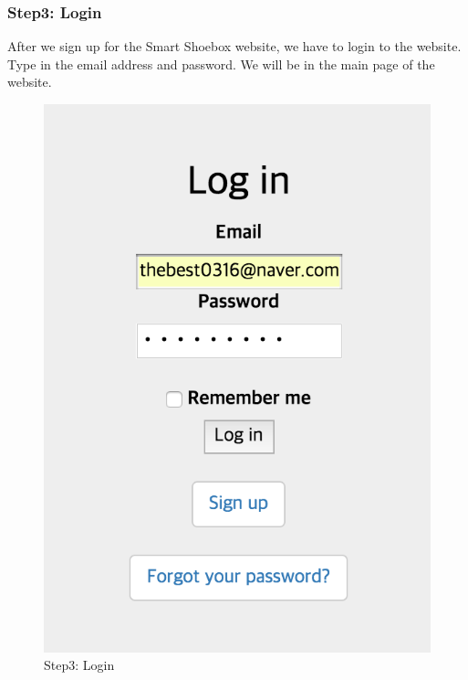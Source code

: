 \documentclass[conference]{IEEEtran}
\begin{document}
\subsubsection{Step3: Login}
After we sign up for the Smart Shoebox website, we have to login to the website. Type in the email address and password. We will be in the main page of the website.
\begin{figure}[H]
\begin{center}
    \includegraphics[scale=0.7]{step3}
    \caption{Step3: Login} \label{fig:label}
\end{center}
\end{figure}
\end{document}

